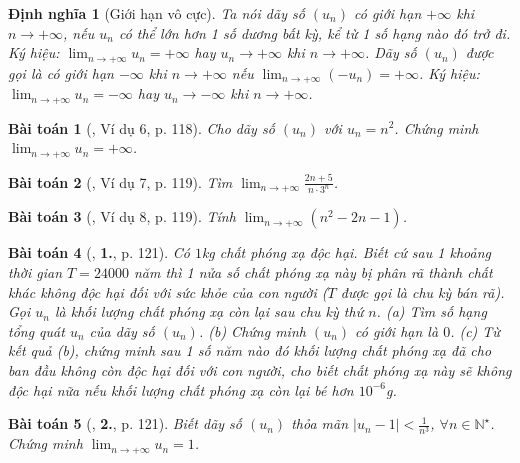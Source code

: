 \documentclass{article}
\numberwithin{equation}{section}
\newtheorem{baitoan}{Bài toán}
\newtheorem{dinhnghia}{Định nghĩa}[section]
\begin{document}
\begin{dinhnghia}[Giới hạn vô cực]
	Ta nói dãy số $(u_n)$ \emph{có giới hạn $+\infty$} khi $n\to+\infty$, nếu $u_n$ có thể lớn hơn 1 số dương bất kỳ, kể từ 1 số hạng nào đó trở đi. Ký hiệu: $\lim_{n\to+\infty} u_n = +\infty$ hay $u_n\to+\infty$ khi $n\to+\infty$. Dãy số $(u_n)$ được gọi là \emph{có giới hạn $-\infty$} khi $n\to+\infty$ nếu $\lim_{n\to+\infty} (-u_n) = +\infty$. Ký hiệu: $\lim_{n\to+\infty} u_n = -\infty$ hay $u_n\to-\infty$ khi $n\to+\infty$.
\end{dinhnghia}

\begin{baitoan}[\cite{SGK_Toan_11_dai_so_giai_tich_co_ban}, Ví dụ 6, p. 118]
	Cho dãy số $(u_n)$ với $u_n = n^2$. Chứng minh $\lim_{n\to+\infty} u_n = +\infty$.
\end{baitoan}

\begin{baitoan}[\cite{SGK_Toan_11_dai_so_giai_tich_co_ban}, Ví dụ 7, p. 119]
	Tìm $\lim_{n\to+\infty} \frac{2n + 5}{n\cdot3^n}$.
\end{baitoan}

\begin{baitoan}[\cite{SGK_Toan_11_dai_so_giai_tich_co_ban}, Ví dụ 8, p. 119]
	Tính $\lim_{n\to+\infty} (n^2 - 2n - 1)$.
\end{baitoan}

\begin{baitoan}[\cite{SGK_Toan_11_dai_so_giai_tich_co_ban}, \textbf{1.}, p. 121]
	Có $1$\emph{kg} chất phóng xạ độc hại. Biết cứ sau 1 khoảng thời gian $T = 24000$ năm thì 1 nửa số chất phóng xạ này bị phân rã thành chất khác không độc hại đối với sức khỏe của con người ($T$ được gọi là \emph{chu kỳ bán rã}). Gọi $u_n$ là khối lượng chất phóng xạ còn lại sau chu kỳ thứ $n$. (a) Tìm số hạng tổng quát $u_n$ của dãy số $(u_n)$. (b) Chứng minh $(u_n)$ có giới hạn là $0$. (c) Từ kết quả (b), chứng minh sau 1 số năm nào đó khối lượng chất phóng xạ đã cho ban đầu không còn độc hại đối với con người, cho biết chất phóng xạ này sẽ không độc hại nữa nếu khối lượng chất phóng xạ còn lại bé hơn $10^{-6}$\emph{g}.
\end{baitoan}

\begin{baitoan}[\cite{SGK_Toan_11_dai_so_giai_tich_co_ban}, \textbf{2.}, p. 121]
	Biết dãy số $(u_n)$ thỏa mãn $|u_n - 1| < \frac{1}{n^3}$, $\forall n\in\mathbb{N}^\star$. Chứng minh $\lim_{n\to+\infty} u_n = 1$.
\end{baitoan}
\end{document}
